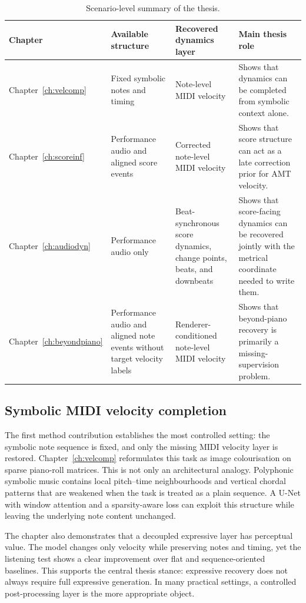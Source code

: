 \begin{table}[!htbp]
\centering
\caption{Scenario-level summary of the thesis.}
\label{tab:conclusion_scenarios}
\small
\renewcommand{\arraystretch}{1.18}
\begin{tabular}{p{}p{}p{}p{}}
\toprule
\textbf{Chapter} & \textbf{Available structure} & \textbf{Recovered dynamics layer} & \textbf{Main thesis role} \\
\midrule
Chapter~\ref{ch:velcomp} & Fixed symbolic notes and timing & Note-level MIDI velocity & Shows that dynamics can be completed from symbolic context alone. \\
Chapter~\ref{ch:scoreinf} & Performance audio and aligned score events & Corrected note-level MIDI velocity & Shows that score structure can act as a late correction prior for AMT velocity. \\
Chapter~\ref{ch:audiodyn} & Performance audio only & Beat-synchronous score dynamics, change points, beats, and downbeats & Shows that score-facing dynamics can be recovered jointly with the metrical coordinate needed to write them. \\
Chapter~\ref{ch:beyondpiano} & Performance audio and aligned note events without target velocity labels & Renderer-conditioned note-level MIDI velocity & Shows that beyond-piano recovery is primarily a missing-supervision problem. \\
\bottomrule
\end{tabular}
\end{table}

\subsection{Symbolic MIDI velocity completion}
\label{ssec:conclusion:ch3}

The first method contribution establishes the most controlled setting: the symbolic note sequence is fixed, and only the missing MIDI velocity layer is restored. Chapter~\ref{ch:velcomp} reformulates this task as image colourisation on sparse piano-roll matrices. This is not only an architectural analogy. Polyphonic symbolic music contains local pitch--time neighbourhoods and vertical chordal patterns that are weakened when the task is treated as a plain sequence. A U-Net with window attention and a sparsity-aware loss can exploit this structure while leaving the underlying note content unchanged.

The chapter also demonstrates that a decoupled expressive layer has perceptual value. The model changes only velocity while preserving notes and timing, yet the listening test shows a clear improvement over flat and sequence-oriented baselines. This supports the central thesis stance: expressive recovery does not always require full expressive generation. In many practical settings, a controlled post-processing layer is the more appropriate object.


